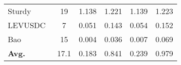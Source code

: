 \begin{table}[t]
\begin{tabular}{lccccc}
Sturdy~\cite{sturbyHack}                                       & 19                    & 1.138             & 1.221             & 1.139                  & 1.223                  \\
LEVUSDC~\cite{levusdcHack}                                      & 7                     & 0.051             & 0.143             & 0.054                  & 0.152                  \\
Bao~\cite{baoHack}                                          & 15                    & 0.004             & 0.036             & 0.007                  & 0.069                   \\
\midrule
\textbf{Avg.} & 17.1 &	0.183 &	0.841 &	0.239 &	0.979\\
\bottomrule
\end{tabular}
\end{table}
